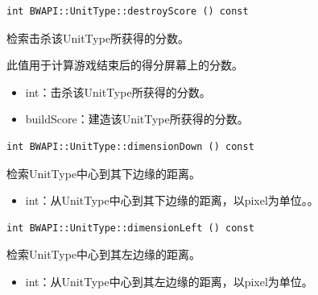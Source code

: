 \begin{tcolorbox}[colback=white, colframe=black!60!white, title=destroyScore(), arc=0mm]
    \begin{verbatim}
int BWAPI::UnitType::destroyScore () const
    \end{verbatim}
    检索击杀该UnitType所获得的分数。\par
    此值用于计算游戏结束后的得分屏幕上的分数。
\begin{return}
\begin{itemize}
    \item int：击杀该UnitType所获得的分数。
\end{itemize}
\end{return}
\begin{refer}
    \begin{itemize}
        \item buildScore：建造该UnitType所获得的分数。
    \end{itemize}
\end{refer}
\end{tcolorbox}


\begin{tcolorbox}[colback=white, colframe=black!60!white, title=dimensionDown(), arc=0mm]
    \begin{verbatim}
int BWAPI::UnitType::dimensionDown () const
    \end{verbatim}
    检索UnitType中心到其下边缘的距离。
\begin{return}
\begin{itemize}
    \item int：从UnitType中心到其下边缘的距离，以pixel为单位。。
\end{itemize}
\end{return}
\end{tcolorbox}


\begin{tcolorbox}[colback=white, colframe=black!60!white, title=dimensionLeft(), arc=0mm]
    \begin{verbatim}
int BWAPI::UnitType::dimensionLeft () const
    \end{verbatim}
    检索UnitType中心到其左边缘的距离。
\begin{return}
\begin{itemize}
    \item int：从UnitType中心到其左边缘的距离，以pixel为单位。
\end{itemize}
\end{return}
\end{tcolorbox}


